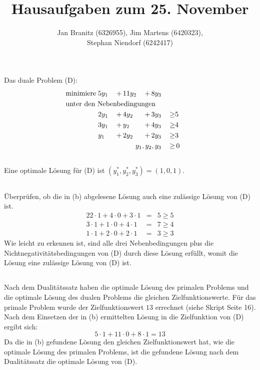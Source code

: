 \documentclass[10pt,a4paper,oneside,ngerman,numbers=noenddot]{scrartcl}
\begin{document}
\author{Jan Branitz (6326955), Jim Martens (6420323),\\
Stephan Niendorf (6242417)}
\title{Hausaufgaben zum 25. November}
\maketitle
\section{} %
	\subsection{} %
		Das duale Problem (D):
		\begin{alignat*}{4}
			\text{minimiere}\; & 5y_{1} \,&+&\, 11y_{2} \,&+&\, 8y_{3} && \\
			\multicolumn{8}{l}{\text{unter den Nebenbedingungen}} && \\
			\;& 2y_{1} \,&+&\, 4y_{2} \,&+&\, 3y_{3} \,&\geq & 5 \\
			\;& 3y_{1} \,&+&\, y_{2} \,&+&\, 4y_{3} \,&\geq & 4 \\
			\;& y_{1} \,&+&\, 2y_{2} \,&+&\, 2y_{3} \,&\geq & 3 \\
			\multicolumn{6}{r}{$y_{1}, y_{2}, y_{3}$} \,&\geq &\, 0
		\end{alignat*}
	\subsection{} %
		Eine optimale Lösung für (D) ist $(y_{1}^{*}, y_{2}^{*}, y_{3}^{*}) = (1, 0, 1)$.
	\subsection{} %
		Überprüfen, ob die in (b) abgelesene Lösung auch eine zulässige Lösung von (D) ist.
		\begin{alignat*}{2}
			2 \cdot 1 + 4 \cdot 0 + 3 \cdot 1 &=& 5 \geq 5 \\
			3 \cdot 1 + 1 \cdot 0 + 4 \cdot 1 &=& 7 \geq 4 \\
			1 \cdot 1 + 2 \cdot 0 + 2 \cdot 1 &=& 3 \geq 3
		\end{alignat*}
		Wie leicht zu erkennen ist, sind alle drei Nebenbedingungen plus die Nichtnegativitätsbedingungen von (D) durch diese Lösung erfüllt, womit die Lösung eine zulässige Lösung von (D) ist.
	\subsection{} %
		Nach dem Dualitätssatz haben die optimale Lösung des primalen Problems und die optimale Lösung des dualen Problems die gleichen Zielfunktionswerte.
		Für das primale Problem wurde der Zielfunktionswert $13$ errechnet (siehe Skript Seite 16). Nach dem Einsetzen der in (b) ermittelten Lösung in die Zielfunktion von (D) ergibt sich:
		\[
			5 \cdot 1 + 11 \cdot 0 + 8 \cdot 1 = 13
		\]
		Da die in (b) gefundene Lösung den gleichen Zielfunktionswert hat, wie die optimale Lösung des primalen Problems, ist die gefundene Lösung nach dem Dualitätssatz die optimale Lösung von (D).
\end{document}
